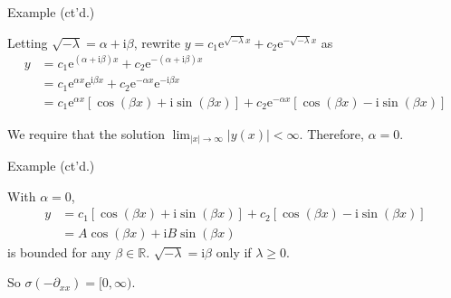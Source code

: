 \documentclass{beamer}
\newcommand{\abs}[1]{\left| #1 \right|}
\begin{document}
\begin{frame}{Example (ct'd.)}

Letting $\sqrt{-\lambda} = \alpha + \mathrm{i} \beta$, rewrite $y = c_1 \mathrm{e}^{\sqrt{-\lambda} x} + c_2 \mathrm{e}^{-\sqrt{-\lambda} x}$ as
\begin{align*}
y &= c_1 \mathrm{e}^{(\alpha + \mathrm{i} \beta) x} + c_2 \mathrm{e}^{-(\alpha + \mathrm{i} \beta) x} \\
    &= c_1 \mathrm{e}^{\alpha x} \mathrm{e}^{\mathrm{i} \beta x} + c_2 \mathrm{e}^{-\alpha x} \mathrm{e}^{-\mathrm{i} \beta x} \\
    &= c_1 \mathrm{e}^{\alpha x} [\cos(\beta x) + \mathrm{i} \sin(\beta x)] + c_2 \mathrm{e}^{-\alpha x} [\cos(\beta x) - \mathrm{i} \sin(\beta x)]
\end{align*}

We require that the solution $\lim_{\abs{x}\to\infty}\abs{y(x)}<\infty.$ Therefore, $\alpha =0$.

\end{frame}

\begin{frame}{Example (ct'd.)}

With $\alpha = 0$,
\begin{align*}
y &= c_1 [\cos(\beta x) + \mathrm{i} \sin(\beta x)] + c_2  [\cos(\beta x) - \mathrm{i} \sin(\beta x)] \\
&= A\cos(\beta x) + \mathrm{i}B \sin(\beta x)
\end{align*}
is bounded for any $\beta \in \mathbb{R}$. $\sqrt{-\lambda} = \mathrm{i} \beta$ only if $\lambda \geq 0$. 

So $\sigma(-\partial_{xx}) = [0,\infty)$. 

\end{frame}

\end{document}
